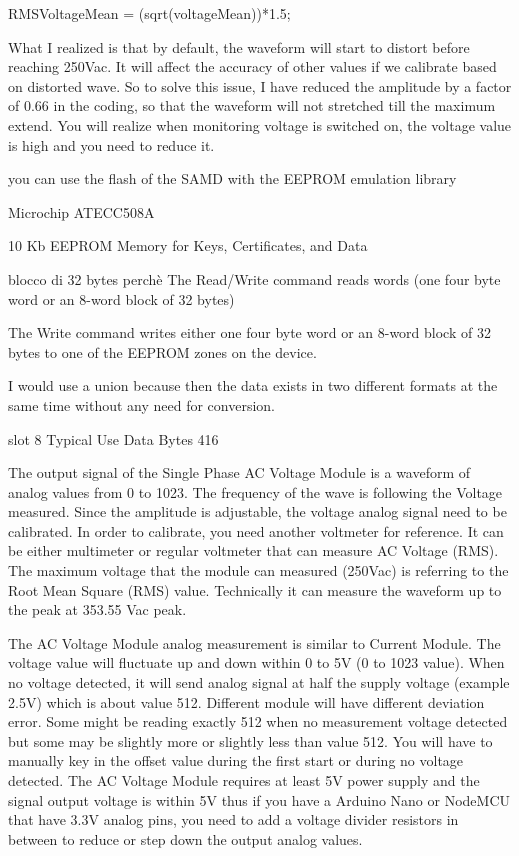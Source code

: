 \documentclass[italian,12pt,a4paper,oneside,final]{report}
\begin{document}
RMSVoltageMean = (sqrt(voltageMean))*1.5;

What I realized is that by default, the waveform will start to distort before reaching 250Vac. It will affect the accuracy of other values if we calibrate based on distorted wave. So to solve this issue, I have reduced the amplitude by a factor of 0.66 in the coding, so that the waveform will not stretched till the maximum extend. You will realize when monitoring voltage is switched on, the voltage value is high and you need to reduce it. 




you can use the flash of the SAMD with the EEPROM emulation library

Microchip ATECC508A

10 Kb EEPROM Memory for Keys, Certificates, and Data


blocco di 32 bytes perchè The Read/Write command reads words (one four byte word or an 8-word block of 32 bytes)

The Write command writes either one four byte word or an 8-word block of 32 bytes to one of the
EEPROM zones on the device.

I would use a union because then the data exists in two different formats at the same time without any need for conversion.

slot 8 Typical Use Data Bytes 416





The output signal of the Single Phase AC Voltage Module is a waveform of analog values from 0 to 1023. The frequency of the wave is following the Voltage measured. Since the amplitude is adjustable, the voltage analog signal need to be calibrated. In order to calibrate, you need another voltmeter for reference. It can be either multimeter or regular voltmeter that can measure AC Voltage (RMS). The maximum voltage that the module can measured (250Vac) is referring to the Root Mean Square (RMS) value. Technically it can measure the waveform up to the peak at 353.55 Vac peak. 

The AC Voltage Module analog measurement is similar to Current Module. The voltage value will fluctuate up and down within 0 to 5V (0 to 1023 value). When no voltage detected, it will send analog signal at half the supply voltage (example 2.5V) which is about value 512. Different module will have different deviation error. Some might be reading exactly 512 when no measurement voltage detected but some may be slightly more or slightly less than value 512. You will have to manually key in the offset value during the first start or during no voltage detected. The AC Voltage Module requires at least 5V power supply and the signal output voltage is within 5V thus if you have a Arduino Nano or NodeMCU that have 3.3V analog pins, you need to add a voltage divider resistors in between to reduce or step down the output analog values.
\end{document}
